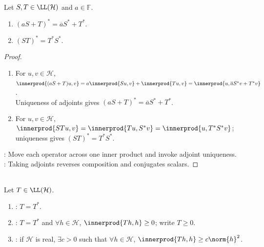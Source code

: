 \begin{corollary} \label{cor:hilbert-adjoint-algebra-identities} \\
Let $S,T\in\LL(\mathcal{H})$ and $a\in\mathbb{F}$.
\begin{enumerate}[label=(\roman*)]
\setlength{\itemsep}{0pt}
\item $(aS+T)^*=\overline{a}S^*+T^*$.
\item $(ST)^*=T^*S^*$.
\end{enumerate}
\begin{proof}
\begin{enumerate}[label=(\roman*)]
\setlength{\itemsep}{0pt}
\item For $u,v\in\mathcal H$, $\innerprod{(aS+T)u,v}=a\innerprod{Su,v}+\innerprod{Tu,v}=\innerprod{u,\overline{a}S^*v+T^*v}$.\\
Uniqueness of adjoints gives $(aS+T)^*=\overline{a}S^*+T^*$.
\item For $u,v\in\mathcal H$, $\innerprod{STu,v}=\innerprod{Tu,S^*v}=\innerprod{u,T^*S^*v}$; uniqueness gives $(ST)^*=T^*S^*$.
\end{enumerate}
: Move each operator across one inner product and invoke adjoint uniqueness.\\
: Taking adjoints reverses composition and conjugates scalars.
\end{proof}
\end{corollary}

\begin{definition} \label{def:hilbert-self-adjoint-positive-coercive} \\
Let $T\in\LL(\mathcal{H})$.
\begin{enumerate}[label=(\roman*)]
\setlength{\itemsep}{0pt}
\item {}: $T=T^*$.
\item {}: $T=T^*$ and $\forall h\in\mathcal{H}$, $\innerprod{Th,h}\geq0$; write $T\geq0$.
\item {}: if $\mathcal{H}$ is real, $\exists c>0$ such that $\forall h\in\mathcal{H}$, $\innerprod{Th,h}\geq c\norm{h}^2$.
\end{enumerate}
\end{definition}

